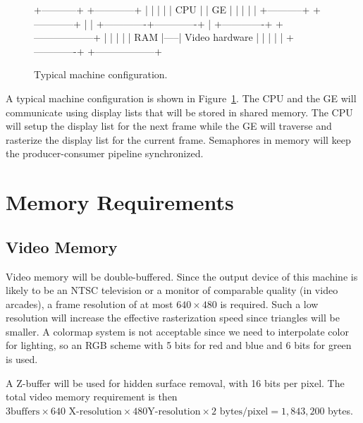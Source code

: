 \documentclass{article}
\begin{document}
\begin{figure}
\begin{verbatimtab}
      +-----------+               +------------+
      |           |               |            |
      |    CPU    |               |     GE     |
      |           |               |            |
      +-----------+               +------------+
            |                           |
            +-------------+-------------+
                          |
                   +-------------+     +------------------+
                   |             |     |                  |
                   |     RAM     |-----|  Video hardware  |
                   |             |     |                  |
                   +-------------+     +------------------+
\end{verbatimtab}
\caption{Typical machine configuration.}
\label{fig:configuration}
\end{figure}

A typical machine configuration is shown in
Figure~\ref{fig:configuration}.
The CPU and the GE will communicate using display lists that will be
stored in shared memory.  The CPU will setup the display list for the next frame
while the GE will traverse and rasterize the display list for
the current frame.  Semaphores in memory will keep the
producer-consumer pipeline synchronized.

\section{Memory Requirements}

\subsection{Video Memory}

Video memory will be double-buffered.  Since the
output device of this machine is likely to be an NTSC television or a monitor
of comparable quality (in video arcades), a frame resolution of at
most $640\times480$ is required.  Such a low resolution will increase the
effective rasterization speed since triangles will be smaller.  A
colormap system is not acceptable since we need to interpolate color
for lighting, so an RGB scheme with 5 bits for red and blue and 6 bits for 
green is used.

A Z-buffer will be used for hidden surface removal, with 16 bits per
pixel.  The total video memory requirement is then $3\mbox{
buffers}\times640\mbox{ X-resolution}\times480\mbox{
Y-resolution}\times2\mbox{ bytes/pixel} = 1,843,200$ bytes.
\end{document}
